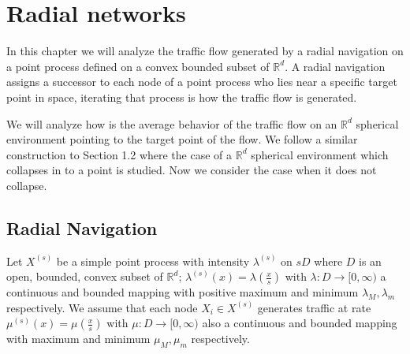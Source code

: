 \chapter{Radial networks}

In this chapter we will analyze the traffic flow generated by a radial navigation on a point process defined on a convex bounded subset of $\mathbb{R}^{d}$. A radial navigation assigns a successor to each node of a point process who lies near a specific target point in space, iterating that process is how the traffic flow is generated.

We will analyze how is the average behavior of the traffic flow on an $\mathbb{R}^{d}$ spherical environment pointing to the target point of the flow. We follow a similar construction to \cite{WIAS} Section 1.2  where the case of a  $\mathbb{R}^{d}$ spherical environment which collapses in to a point is studied. Now we consider the case when it does not collapse.

\section{Radial Navigation}
Let $X^{(s)}$ be a simple point process with intensity $\lambda^{(s)}$ on $sD$ where $D$ is an open, bounded, convex subset of $\mathbb{R}^{d}$; $\lambda^{(s)}(x)=\lambda(\frac{x}{s})$ with $\lambda: D\rightarrow [0,\infty)$ a continuous and bounded mapping with positive maximum and minimum $\lambda_M, \lambda_m$ respectively. We assume that each node $X_i\in X^{(s)}$ generates traffic at rate $\mu^{(s)}(x)=\mu(\frac{x}{s})$ with $\mu: D\rightarrow [0,\infty)$ also a continuous and bounded mapping with maximum and minimum $\mu_M, \mu_m$ respectively.

